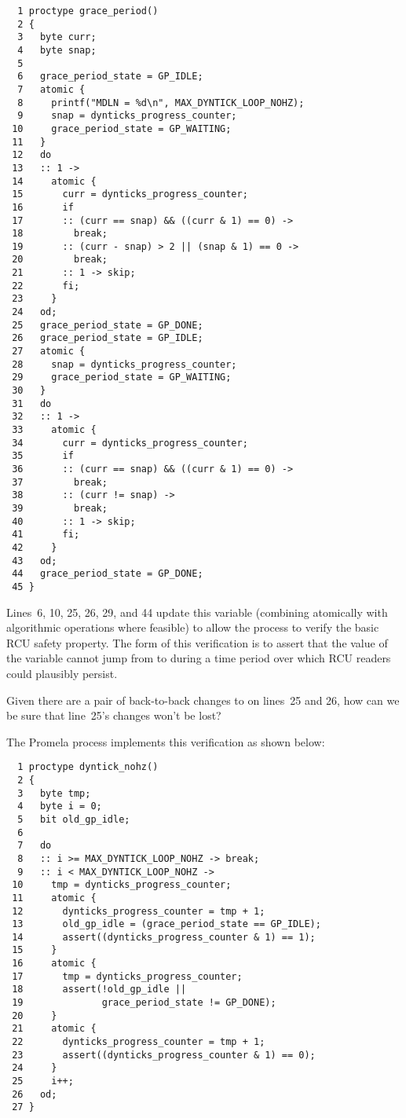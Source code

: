 { \scriptsize
\begin{verbatim}
  1 proctype grace_period()
  2 {
  3   byte curr;
  4   byte snap;
  5
  6   grace_period_state = GP_IDLE;
  7   atomic {
  8     printf("MDLN = %d\n", MAX_DYNTICK_LOOP_NOHZ);
  9     snap = dynticks_progress_counter;
 10     grace_period_state = GP_WAITING;
 11   }
 12   do
 13   :: 1 ->
 14     atomic {
 15       curr = dynticks_progress_counter;
 16       if
 17       :: (curr == snap) && ((curr & 1) == 0) ->
 18         break;
 19       :: (curr - snap) > 2 || (snap & 1) == 0 ->
 20         break;
 21       :: 1 -> skip;
 22       fi;
 23     }
 24   od;
 25   grace_period_state = GP_DONE;
 26   grace_period_state = GP_IDLE;
 27   atomic {
 28     snap = dynticks_progress_counter;
 29     grace_period_state = GP_WAITING;
 30   }
 31   do
 32   :: 1 ->
 33     atomic {
 34       curr = dynticks_progress_counter;
 35       if
 36       :: (curr == snap) && ((curr & 1) == 0) ->
 37         break;
 38       :: (curr != snap) ->
 39         break;
 40       :: 1 -> skip;
 41       fi;
 42     }
 43   od;
 44   grace_period_state = GP_DONE;
 45 }
\end{verbatim}
}

Lines~6, 10, 25, 26, 29, and 44 update this variable (combining
atomically with algorithmic operations where feasible) to
allow the  process to verify the basic
RCU safety property.
The form of this verification is to assert that the value of the
 variable cannot jump from
 to  during a time period
over which RCU readers could plausibly persist.

\QuickQuiz{}
	Given there are a pair of back-to-back changes to
	 on lines~25 and 26,
	how can we be sure that line~25's changes won't be lost?
 \QuickQuizEnd

The  Promela process implements
this verification as shown below:

{ \scriptsize
\begin{verbatim}
  1 proctype dyntick_nohz()
  2 {
  3   byte tmp;
  4   byte i = 0;
  5   bit old_gp_idle;
  6
  7   do
  8   :: i >= MAX_DYNTICK_LOOP_NOHZ -> break;
  9   :: i < MAX_DYNTICK_LOOP_NOHZ ->
 10     tmp = dynticks_progress_counter;
 11     atomic {
 12       dynticks_progress_counter = tmp + 1;
 13       old_gp_idle = (grace_period_state == GP_IDLE);
 14       assert((dynticks_progress_counter & 1) == 1);
 15     }
 16     atomic {
 17       tmp = dynticks_progress_counter;
 18       assert(!old_gp_idle ||
 19              grace_period_state != GP_DONE);
 20     }
 21     atomic {
 22       dynticks_progress_counter = tmp + 1;
 23       assert((dynticks_progress_counter & 1) == 0);
 24     }
 25     i++;
 26   od;
 27 }
\end{verbatim}
}

